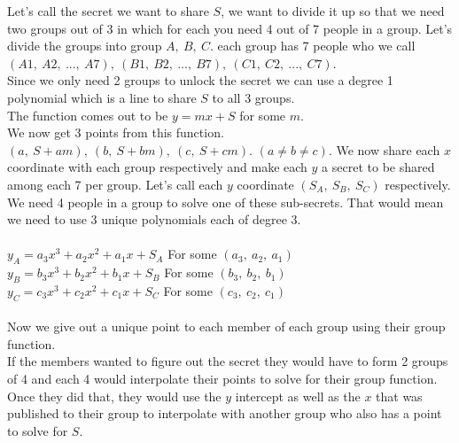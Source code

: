 \documentclass[11pt,letterpaper]{article}
\begin{document}
Let's call the secret we want to share $S$, we want to divide it up so that we need two groups out of 3 in which for each you need 4 out of 7 people in a group. Let's divide the groups into group $A,~B,~C$. each group has 7 people who we call $(A1,~A2,~ ...,~ A7),~(B1,~B2,~ ...,~ B7),~(C1,~C2,~ ...,~ C7)$.\\
Since we only need 2 groups to unlock the secret we can use a degree 1 polynomial which is a line to share $S$ to all 3 groups.\\ The function comes out to be $y=mx + S$ for some $m$. \\We now get 3 points from this function. $(a,~S+am),~(b,~S+bm),~(c,~S+cm).$ $(a\neq b\neq c)$. We now share each  $x$ coordinate with each group respectively and make each $y$ a secret to be shared among each 7 per group.
Let's call each $y$ coordinate $(S_A,~S_B,~S_C)$ respectively. We need 4 people in a group to solve one of these sub-secrets. That would mean we need to use 3 unique polynomials each of degree 3.\\
\\
$y_A = a_3x^3 + a_2x^2 + a_1x + S_A$ For some $(a_3,~a_2,~a_1)$\\
$y_B = b_3x^3 + b_2x^2 + b_1x + S_B$ For some $(b_3,~b_2,~b_1)$\\
$y_C = c_3x^3 + c_2x^2 + c_1x + S_C$ For some $(c_3,~c_2,~c_1)$\\
\\
Now we give out a unique point to each member of each group using their group function.\\
If the members wanted to figure out the secret they would have to form 2 groups of 4 and each 4 would interpolate their points to solve for their group function. Once they did that, they would use the $y$ intercept as well as the $x$ that was published to their group to interpolate with another group who also has a point to solve for $S$.
\clearpage
\end{document}

